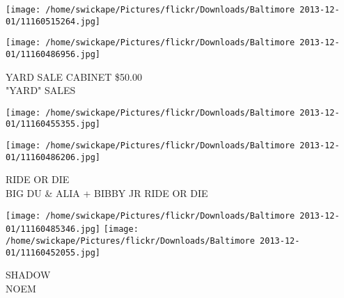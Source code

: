 \documentclass[10pt,letterpaper]{article}
\begin{document}
\texttt{[image: /home/swickape/Pictures/flickr/Downloads/Baltimore 2013-12-01/11160515264.jpg]}

\vspace{0.25in}
\texttt{[image: /home/swickape/Pictures/flickr/Downloads/Baltimore 2013-12-01/11160486956.jpg]}

YARD SALE CABINET \$50.00\\
"YARD" SALES
\pagebreak

\texttt{[image: /home/swickape/Pictures/flickr/Downloads/Baltimore 2013-12-01/11160455355.jpg]}

\vspace{0.25in}
\texttt{[image: /home/swickape/Pictures/flickr/Downloads/Baltimore 2013-12-01/11160486206.jpg]}

RIDE OR DIE\\
BIG DU \& ALIA + BIBBY JR RIDE OR DIE
\pagebreak

\texttt{[image: /home/swickape/Pictures/flickr/Downloads/Baltimore 2013-12-01/11160485346.jpg]}
\texttt{[image: /home/swickape/Pictures/flickr/Downloads/Baltimore 2013-12-01/11160452055.jpg]}

SHADOW\\
NOEM
\pagebreak
\end{document}
